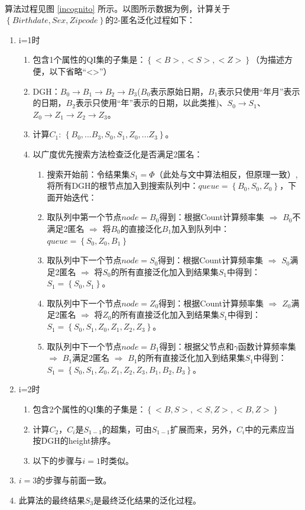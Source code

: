 \documentclass[12pt,a4paper]{article}
\begin{document}
\paragraph{}算法过程见图 \ref{incognito} 所示。以图所示数据为例，计算关于$\left \{Birthdate, Sex, Zipcode \right \}$的2-匿名泛化过程如下：
\begin{enumerate}
	\item i=1时
	\begin{enumerate}
		\item 包含1个属性的QI集的子集是：$\left \{ <B>,<S>,<Z> \right \}$（为描述方便，以下省略“<>”）
		\item DGH：$B_0 \rightarrow B_1 \rightarrow B_2 \rightarrow B_3$($B_0$表示原始日期，$B_1$表示只使用“年月”表示的日期，$B_2$表示只使用“年”表示的日期，以此类推)、$S_0 \rightarrow S_1$、$Z_0 \rightarrow Z_1 \rightarrow Z_2 \rightarrow Z_3$。
		\item 计算$C_1$: $ \left \{ B_0,...B_3,S_0,S_1,Z_0,...Z_3 \right \}$。
		\item 以广度优先搜索方法检查泛化是否满足2匿名：
		\begin{enumerate}
			\item 搜索开始前：令结果集$S_1 = \Phi$（此处与文中算法相反，但原理一致）,将所有DGH的根节点加入到搜索队列中：$queue=\left \{ B_0, S_0, Z_0 \right \}$，下面开始迭代：
			\item 取队列中第一个节点$node=B_0$得到：根据Count计算频率集 $\Rightarrow$ $B_0$不满足2匿名 $\Rightarrow$ 将$B_0$的直接泛化$B_1$加入到队列中：$queue=\left \{ S_0, Z_0, B_1 \right \}$
			\item 取队列中下一个节点$node=S_0$得到：根据Count计算频率集 $\Rightarrow$ $S_0$满足2匿名 $\Rightarrow$ 将$S_0$的所有直接泛化加入到结果集$S_1$中得到：$S_1=\left \{ S_0, S_1 \right \}$。
			\item 取队列中下一个节点$node=Z_0$得到：根据Count计算频率集 $\Rightarrow$ $Z_0$满足2匿名 $\Rightarrow$ 将$Z_0$的所有直接泛化加入到结果集$S_1$中得到：$S_1=\left \{ S_0, S_1, Z_0, Z_1, Z_2, Z_3 \right \}$。
			\item 取队列中下一个节点$node=B_1$得到：根据父节点和$\gamma$函数计算频率集 $\Rightarrow$ $B_1$满足2匿名 $\Rightarrow$ $B_1$的所有直接泛化加入到结果集$S_1$中得到：$S_1=\left \{ S_0, S_1, Z_0, Z_1, Z_2, Z_3, B_1,B_2,B_3 \right \}$。
		\end{enumerate}
	\end{enumerate}
	\item i=2时
	\begin{enumerate}
		\item 包含2个属性的QI集的子集是：$\left \{ <B,S>,<S,Z>,<B,Z> \right \}$
		\item 计算$C_2$，$C_i$是$S_{1-1}$的超集，可由$S_{1-1}$扩展而来，另外，$C_i$中的元素应当按DGH的height排序。
		\item 以下的步骤与$i=1$时类似。
	\end{enumerate}
	\item $i=3$的步骤与前面一致。
	\item 此算法的最终结果$S_3$是最终泛化结果的泛化过程。
\end{enumerate}
\end{document}
